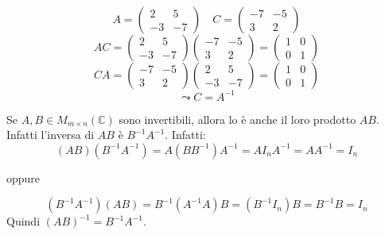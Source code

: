 \documentclass[a4paper]{article}
\theoremstyle{break}
\theoremstyle{break}
\theoremstyle{break}
\theoremstyle{break}
\begin{document}
\begin{figure}[H]
  \begin{example}
    \[
    A = \begin{pmatrix}
      2 & 5\\
      -3 & -7
    \end{pmatrix} 
    \quad
    C = \begin{pmatrix} 
      -7 & -5\\
      3 & 2
    \end{pmatrix} 
    \] 
    \[
    AC = \begin{pmatrix} 
      2 & 5\\
      -3 & -7
    \end{pmatrix}
    \begin{pmatrix} 
      -7 & -5\\
      3 & 2
    \end{pmatrix}
    =
    \begin{pmatrix} 
      1 & 0\\
      0 & 1
    \end{pmatrix}
    \] 
    \[
    CA = \begin{pmatrix} 
      -7 & -5\\
      3 & 2
    \end{pmatrix}
    \begin{pmatrix} 
      2 & 5\\
      -3 & -7
    \end{pmatrix}
    =
    \begin{pmatrix} 
      1 & 0\\
      0 & 1
    \end{pmatrix}
    \] 
    \[
      \leadsto C = A^{-1}
    \] 
  \end{example}
\end{figure}

\noindent Se \( A,B \in M_{m \times n}(\mathbb{C}) \) sono invertibili, allora lo è anche
il loro prodotto \( AB \). Infatti l'inversa di \( AB \) è \( B^{-1}A^{-1} \).
Infatti:
\[
  (AB)(B^{-1}A^{-1}) = A(BB^{-1})A^{-1} = A I_n A^{-1} = AA^{-1} = I_n
\] 
\begin{center}
  oppure
\end{center}
\[
  (B^{-1}A^{-1})(AB) = B^{-1}(A^{-1}A)B = (B^{-1}I_n)B = B^{-1}B = I_n
\] 
Quindi \( (AB)^{-1} = B^{-1}A^{-1} \).
\end{document}
